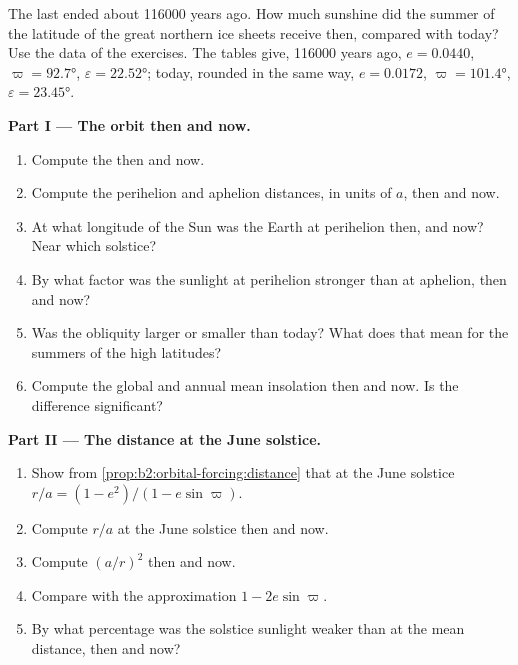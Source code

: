 \begin{problem}\label{pb:b2:orbital-forcing:1}
The last  ended about \num{116000} years ago. How much sunshine did the summer of the
latitude of the great northern ice sheets receive then, compared with today? Use the data of the
exercises. The tables give, \num{116000} years ago, $e = 0.0440$, $\varpi = \ang{92.7}$,
$\varepsilon = \ang{22.52}$; today, rounded in the same way, $e = 0.0172$, $\varpi = \ang{101.4}$,
$\varepsilon = \ang{23.45}$.

\medskip\noindent\textbf{Part I --- The orbit then and now.}
\begin{enumerate}
  \item Compute the  then and now.
  \item Compute the perihelion and aphelion distances, in units of $a$, then and now.
  \item At what longitude of the Sun was the Earth at perihelion then, and now? Near which solstice?
  \item By what factor was the sunlight at perihelion stronger than at aphelion, then and now?
  \item Was the obliquity larger or smaller than today? What does that mean for the summers of the
        high latitudes?
  \item Compute the global and annual mean insolation then and now. Is the difference significant?
\end{enumerate}

\medskip\noindent\textbf{Part II --- The distance at the June solstice.}
\begin{enumerate}[resume]
  \item Show from \cref{prop:b2:orbital-forcing:distance} that at the June solstice $r/a = (1 -
        e^2)/(1 - e\sin\varpi)$.
  \item Compute $r/a$ at the June solstice then and now.
  \item Compute $(a/r)^2$ then and now.
  \item Compare with the approximation $1 - 2e\sin\varpi$.
  \item By what percentage was the solstice sunlight weaker than at the mean distance, then and now?
\end{enumerate}


\end{problem}
